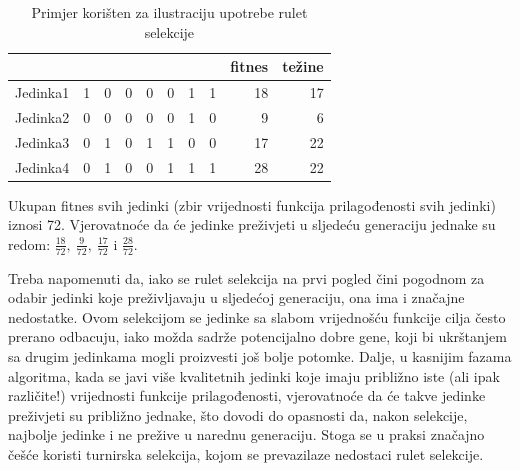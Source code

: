 \documentclass[a4paper, utf8, 11pt, colorlinks]{book}
\begin{document}
\begin{table}
	\centering
	\begin{tabular}{l|rrrrrrrrr}
		& \multicolumn{1}{l}{} & \multicolumn{1}{l}{} & \multicolumn{1}{l}{} & \multicolumn{1}{l}{} & \multicolumn{1}{l}{} & \multicolumn{1}{l}{} & \multicolumn{1}{l}{} & \multicolumn{1}{l}{fitnes} & \multicolumn{1}{l}{težine}  \\\hline
		Jedinka1 & 1                    & 0                    & 0                    & 0                    & 0                    & 1                    & 1                    & 18                         & 17                          \\
		Jedinka2 & 0                    & 0                    & 0                    & 0                    & 0                    & 1                    & 0                    & 9                          & 6                           \\
		Jedinka3 & 0                    & 1                    & 0                    & 1                    & 1                    & 0                    & 0                    & 17                         & 22                          \\
		Jedinka4 & 0                    & 1                    & 0                    & 0                    & 1                    & 1                    & 1                    & 28                         & 22      \\\hline                   
	\end{tabular}\caption{Primjer korišten za ilustraciju upotrebe rulet selekcije}
	\label{tab:rulet}
\end{table}
Ukupan fitnes svih jedinki (zbir vrijednosti funkcija prilagođenosti svih jedinki) iznosi 72. Vjerovatnoće da će jedinke preživjeti u sljedeću generaciju jednake su redom: $\frac{18}{72},\ \frac{9}{72},\ \frac{17}{72}$ i $\frac{28}{72}$. 

Treba napomenuti da, iako se rulet selekcija na prvi pogled čini pogodnom za odabir jedinki koje preživljavaju u sljedećoj generaciju, ona ima i značajne nedostatke. Ovom selekcijom se jedinke sa slabom vrijednošću funkcije cilja često prerano odbacuju, iako možda sadrže potencijalno dobre gene, koji bi ukrštanjem sa drugim jedinkama mogli proizvesti još bolje potomke. Dalje, u kasnijim fazama algoritma, kada se javi više kvalitetnih jedinki koje imaju približno iste (ali ipak različite!) vrijednosti funkcije prilagođenosti, vjerovatnoće da će takve jedinke preživjeti su približno jednake, što dovodi do opasnosti da, nakon selekcije, najbolje jedinke i ne prežive u narednu generaciju. Stoga se u praksi značajno češće koristi turnirska selekcija, kojom se prevazilaze nedostaci rulet selekcije.
\end{document}
